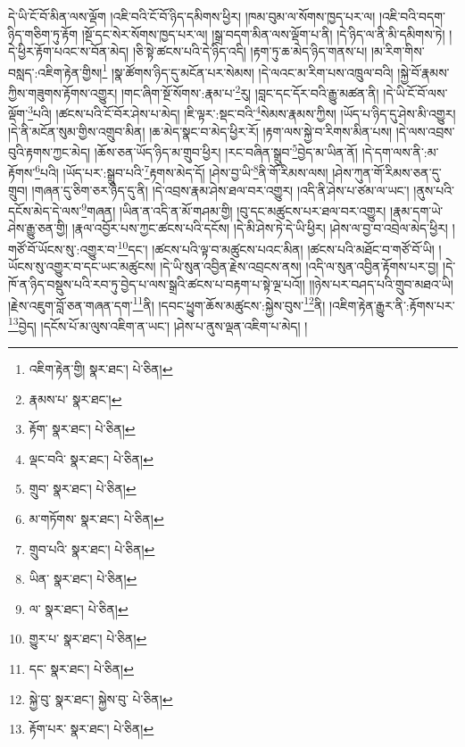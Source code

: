 དེ་ཡི་ངོ་བོ་མིན་ལས་ལྡོག །འཇི་བའི་ངོ་བོ་ཉིད་དམིགས་ཕྱིར། །ཁམ་བུམ་ལ་སོགས་ཁྱད་པར་ལ། །འཇི་བའི་བདག་ཉིད་གཅིག་ཏུ་རྟོག །སྔོ་དང་སེར་སོགས་ཁྱད་པར་ལ། །སྒྲ་བདག་མིན་ལས་ལྡོག་པ་ནི། །དེ་ཉིད་ལ་ནི་མི་དམིགས་ཏེ། །དེ་ཕྱིར་རྟོག་པའང་ས་བོན་མེད། །ཅི་སྟེ་ཚངས་པའི་དེ་ཉིད་འདི། །རྟག་ཏུ་ཆ་མེད་ཉིད་གནས་པ། །མ་རིག་གིས་བསླད་:འཇིག་རྟེན་གྱིས།\footnote{འཇིག་རྟེན་གྱི།  སྣར་ཐང་།  པེ་ཅིན། } །སྣ་ཚོགས་ཉིད་དུ་མངོན་པར་སེམས། །དེ་ལའང་མ་རིག་པས་འཁྲུལ་བའི། །སྐྱེ་བོ་རྣམས་ཀྱིས་གཟུགས་རྟོགས་འགྱུར། །གང་ཞིག་སྔོ་སོགས་:རྣམ་པ་\footnote{རྣམས་པ་  སྣར་ཐང་། }རུ། །བླང་དང་དོར་བའི་རྒྱུ་མཚན་ནི། །དེ་ཡི་ངོ་བོ་ལས་ལྡོག་\footnote{རྟོག་  སྣར་ཐང་།  པེ་ཅིན། }པའི། །ཚངས་པའི་ངོ་བོར་ཤེས་པ་མེད། །ཇི་ལྟར་:སྡང་བའི་\footnote{ལྡང་བའི་  སྣར་ཐང་།  པེ་ཅིན། }སེམས་རྣམས་ཀྱིས། །ཡོད་པ་ཉིད་དུ་ཤེས་མི་འགྱུར། །དེ་ནི་མངོན་སུམ་གྱིས་འགྲུབ་མིན། །ཆ་མེད་སྣང་བ་མེད་ཕྱིར་རོ། །རྟག་ལས་སྐྱེ་བ་རིགས་མིན་པས། །དེ་ལས་འབྲས་བུའི་རྟགས་ཀྱང་མེད། །ཆོས་ཅན་ཡོད་ཉིད་མ་གྲུབ་ཕྱིར། །རང་བཞིན་སྒྲུབ་\footnote{གྲུབ་  སྣར་ཐང་།  པེ་ཅིན། }བྱེད་མ་ཡིན་ནོ། །དེ་དག་ལས་ནི་:མ་རྟོགས་\footnote{མ་གཏོགས་  སྣར་ཐང་།  པེ་ཅིན། }པའི། །ཡོད་པར་:སྒྲུབ་པའི་\footnote{གྲུབ་པའི་  སྣར་ཐང་།  པེ་ཅིན། }རྟགས་མེད་དོ། །ཤེས་བྱ་ཡི་\footnote{ཡིན་  སྣར་ཐང་།  པེ་ཅིན། }ནི་གོ་རིམས་ལས། །ཤེས་ཀུན་གོ་རིམས་ཅན་དུ་གྲུབ། །གཞན་དུ་ཅིག་ཅར་ཉིད་དུ་ནི། །དེ་འབྲས་རྣམ་ཤེས་ཐལ་བར་འགྱུར། །འདི་ནི་ཤེས་པ་ཙམ་ལ་ཡང་། །ནུས་པའི་དངོས་མེད་དེ་ལས་\footnote{ལ་  སྣར་ཐང་།  པེ་ཅིན། }གཞན། །ཡིན་ན་འདི་ན་མོ་གཤམ་གྱི། །བུ་དང་མཚུངས་པར་ཐལ་བར་འགྱུར། །རྣམ་དག་ཡེ་ཤེས་རྒྱུ་ཅན་གྱི། །རྣལ་འབྱོར་པས་ཀྱང་ཚངས་པའི་དངོས། །དེ་མི་ཤེས་ཏེ་དེ་ཡི་ཕྱིར། །ཤེས་ལ་བྱ་བ་འབྲེལ་མེད་ཕྱིར། །གཙོ་བོ་ཡོངས་སུ་:འགྱུར་བ་\footnote{གྱུར་པ་  སྣར་ཐང་།  པེ་ཅིན། }དང་། །ཚངས་པའི་ལྟ་བ་མཚུངས་པའང་མིན། །ཚངས་པའི་མཐོང་བ་གཙོ་བོ་ཡི། །ཡོངས་སུ་འགྱུར་བ་དང་ཡང་མཚུངས། །དེ་ཡི་སུན་འབྱིན་རྗེས་འབྲངས་ནས། །འདི་ལ་སུན་འབྱིན་རྟོགས་པར་བྱ། །དེ་ཁོ་ན་ཉིད་བསྡུས་པའི་རབ་ཏུ་བྱེད་པ་ལས་སྒྲའི་ཚངས་པ་བརྟག་པ་སྟེ་ལྔ་པའོ།། །།ཉེས་པར་བཤད་པའི་གྲུབ་མཐའ་ཡི། །རྗེས་འཇུག་བློ་ཅན་གཞན་དག་\footnote{དང་  སྣར་ཐང་།  པེ་ཅིན། }ནི། །དབང་ཕྱུག་ཆོས་མཚུངས་:སྐྱེས་བུས་\footnote{སྐྱེ་བུ་  སྣར་ཐང་། སྐྱེས་བུ་  པེ་ཅིན། }ནི། །འཇིག་རྟེན་རྒྱུར་ནི་:རྟོགས་པར་\footnote{རྟོག་པར་  སྣར་ཐང་།  པེ་ཅིན། }བྱེད། །དངོས་པོ་མ་ལུས་འཇིག་ན་ཡང་། །ཤེས་པ་ནུས་ལྡན་འཇིག་པ་མེད། །
